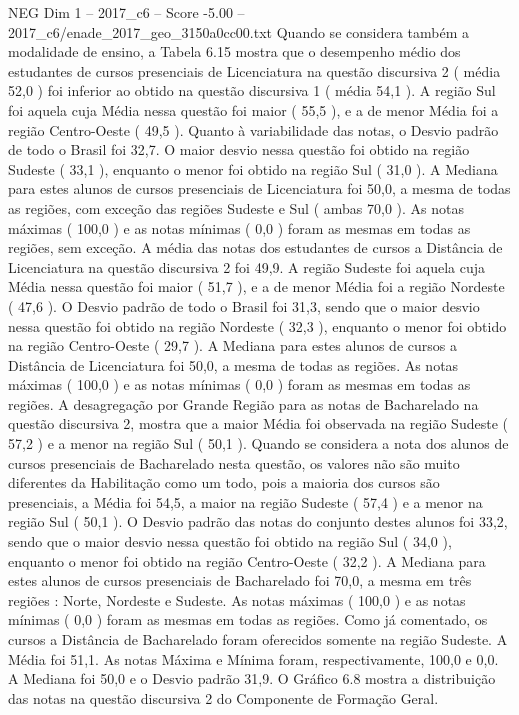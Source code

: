 \begin{textsample}{NEG Dim 1 – 2017\_c6 – Score -5.00 – 2017\_c6/enade\_2017\_geo\_3150a0cc00.txt}
Quando se considera também a modalidade de ensino, a Tabela 6.15 mostra que o desempenho médio dos estudantes de cursos presenciais de Licenciatura na questão discursiva 2 ( média 52,0 ) foi inferior ao obtido na questão discursiva 1 ( média 54,1 ).
A região Sul foi aquela cuja Média nessa questão foi maior ( 55,5 ), e a de menor Média foi a região Centro-Oeste ( 49,5 ).
Quanto à variabilidade das notas, o Desvio padrão de todo o Brasil foi 32,7.
O maior desvio nessa questão foi obtido na região Sudeste ( 33,1 ), enquanto o menor foi obtido na região Sul ( 31,0 ).
A Mediana para estes alunos de cursos presenciais de Licenciatura foi 50,0, a mesma de todas as regiões, com exceção das regiões Sudeste e Sul ( ambas 70,0 ).
As notas máximas ( 100,0 ) e as notas mínimas ( 0,0 ) foram as mesmas em todas as regiões, sem exceção.
A média das notas dos estudantes de cursos a Distância de Licenciatura na questão discursiva 2 foi 49,9.
A região Sudeste foi aquela cuja Média nessa questão foi maior ( 51,7 ), e a de menor Média foi a região Nordeste ( 47,6 ).
O Desvio padrão de todo o Brasil foi 31,3, sendo que o maior desvio nessa questão foi obtido na região Nordeste ( 32,3 ), enquanto o menor foi obtido na região Centro-Oeste ( 29,7 ).
A Mediana para estes alunos de cursos a Distância de Licenciatura foi 50,0, a mesma de todas as regiões.
As notas máximas ( 100,0 ) e as notas mínimas ( 0,0 ) foram as mesmas em todas as regiões.
A desagregação por Grande Região para as notas de Bacharelado na questão discursiva 2, mostra que a maior Média foi observada na região Sudeste ( 57,2 ) e a menor na região Sul ( 50,1 ).
Quando se considera a nota dos alunos de cursos presenciais de Bacharelado nesta questão, os valores não são muito diferentes da Habilitação como um todo, pois a maioria dos cursos são presenciais, a Média foi 54,5, a maior na região Sudeste ( 57,4 ) e a menor na região Sul ( 50,1 ).
O Desvio padrão das notas do conjunto destes alunos foi 33,2, sendo que o maior desvio nessa questão foi obtido na região Sul ( 34,0 ), enquanto o menor foi obtido na região Centro-Oeste ( 32,2 ).
A Mediana para estes alunos de cursos presenciais de Bacharelado foi 70,0, a mesma em três regiões : Norte, Nordeste e Sudeste.
As notas máximas ( 100,0 ) e as notas mínimas ( 0,0 ) foram as mesmas em todas as regiões.
Como já comentado, os cursos a Distância de Bacharelado foram oferecidos somente na região Sudeste.
A Média foi 51,1.
As notas Máxima e Mínima foram, respectivamente, 100,0 e 0,0.
A Mediana foi 50,0 e o Desvio padrão 31,9.
O Gráfico 6.8 mostra a distribuição das notas na questão discursiva 2 do Componente de Formação Geral.

\end{textsample}
